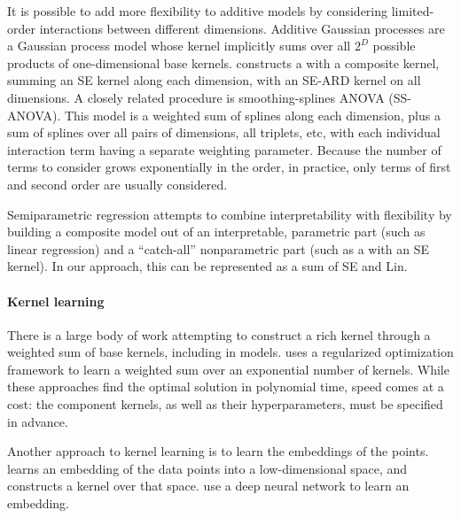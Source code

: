 \documentclass[twoside]{article}
\begin{document}
It is possible to add more flexibility to additive models by considering limited-order interactions between different dimensions. 
Additive Gaussian processes \cite{duvenaud2011additive11} are a Gaussian process model whose kernel implicitly sums over all $2^D$ possible products of one-dimensional base kernels.  
\cite{plate1999accuracy} constructs a \gp{} with a composite kernel, summing an SE kernel along each dimension, with an SE-ARD kernel on all dimensions.
A closely related procedure is smoothing-splines ANOVA (SS-ANOVA)\cite{wahba1990spline, gu2002smoothing}.
This model is a weighted sum of splines along each dimension, plus a sum of splines over all pairs of dimensions, all triplets, etc, with each individual interaction term having a separate weighting parameter.
Because the number of terms to consider grows exponentially in the order, in practice, only terms of first and second order are usually considered.

Semiparametric regression  attempts to combine interpretability with flexibility by building  a composite model out of an interpretable, parametric part (such as linear regression) and a ``catch-all'' nonparametric part (such as a \gp{} with an SE kernel).
In our approach, this can be represented as a sum of SE and Lin.

\paragraph{Kernel learning}
There is a large body of work attempting to construct a rich kernel through a weighted sum of base kernels, including in \gp{} models.  
\cite{christoudias2009bayesian}
\cite{Bach_HKL} uses a regularized optimization framework to learn a weighted sum over an exponential number of kernels.
While these approaches find the optimal solution in polynomial time, speed comes at a cost: the component kernels, as well as their hyperparameters, must be specified in advance.

Another approach to kernel learning is to learn the embeddings of the points. 
 learns an embedding of the data points into a low-dimensional space, and constructs a kernel over that space. 
\citet{salakhutdinov2008using} use a deep neural network to learn an embedding. 
\end{document}
